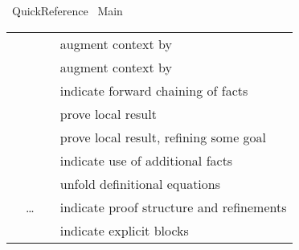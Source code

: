 %
\begin{isabellebody}%
\def\isabellecontext{Quick{\isacharunderscore}Reference}%
%
\isadelimtheory
%
\endisadelimtheory
%
\isatagtheory
{}\isamarkupfalse%
\ Quick{\isacharunderscore}Reference\isanewline
{}\ Main\isanewline
{}%
\endisatagtheory
{\isafoldtheory}%
%
\isadelimtheory
%
\endisadelimtheory
%
\isamarkuptrue%
%
\isamarkuptrue%
%
\isamarkuptrue%
%
\begin{isamarkuptext}%
\begin{tabular}{ll}
    \hyperlink{command.fix}{\mbox{\isa{\isacommand{fix}}}}~\isa{x} & augment context by \isa{{\isachardoublequote}{\isasymAnd}x{\isachardot}\ {\isasymbox}{\isachardoublequote}} \\
    \hyperlink{command.assume}{\mbox{\isa{\isacommand{assume}}}}~\isa{{\isachardoublequote}a{\isacharcolon}\ {\isasymphi}{\isachardoublequote}} & augment context by \isa{{\isachardoublequote}{\isasymphi}\ {\isasymLongrightarrow}\ {\isasymbox}{\isachardoublequote}} \\
    \hyperlink{command.then}{\mbox{\isa{\isacommand{then}}}} & indicate forward chaining of facts \\
    \hyperlink{command.have}{\mbox{\isa{\isacommand{have}}}}~\isa{{\isachardoublequote}a{\isacharcolon}\ {\isasymphi}{\isachardoublequote}} & prove local result \\
    \hyperlink{command.show}{\mbox{\isa{\isacommand{show}}}}~\isa{{\isachardoublequote}a{\isacharcolon}\ {\isasymphi}{\isachardoublequote}} & prove local result, refining some goal \\
    \hyperlink{command.using}{\mbox{\isa{\isacommand{using}}}}~\isa{a} & indicate use of additional facts \\
    \hyperlink{command.unfolding}{\mbox{\isa{\isacommand{unfolding}}}}~\isa{a} & unfold definitional equations \\
    \hyperlink{command.proof}{\mbox{\isa{\isacommand{proof}}}}~\isa{{\isachardoublequote}m\isactrlsub {\isadigit{1}}{\isachardoublequote}}~\dots~\hyperlink{command.qed}{\mbox{\isa{\isacommand{qed}}}}~\isa{{\isachardoublequote}m\isactrlsub {\isadigit{2}}{\isachardoublequote}} & indicate proof structure and refinements \\
    \hyperlink{command.braceleft}{\mbox{\isa{\isacommand{{\isacharbraceleft}}}}}~\isa{{\isachardoublequote}{\isasymdots}{\isachardoublequote}}~\hyperlink{command.braceright}{\mbox{\isa{\isacommand{{\isacharbraceright}}}}} & indicate explicit blocks \\

\end{tabular}
\end{isamarkuptext}
\end{isabellebody}
